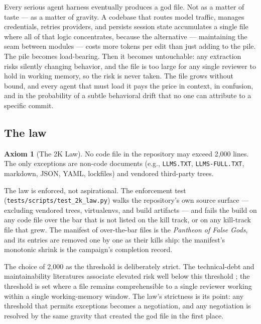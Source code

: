 \documentclass[11pt]{article}
\theoremstyle{definition}
\newtheorem{axiom}{Axiom}
\theoremstyle{plain}
\theoremstyle{remark}
\begin{document}
Every serious agent harness eventually produces a god file. Not as a matter
of taste --- as a matter of gravity. A codebase that routes model traffic,
manages credentials, retries providers, and persists session state
accumulates a single file where all of that logic concentrates, because the
alternative --- maintaining the seam between modules --- costs more tokens
per edit than just adding to the pile. The pile becomes load-bearing. Then
it becomes untouchable: any extraction risks silently changing behavior, and
the file is too large for any single reviewer to hold in working memory, so
the risk is never taken. The file grows without bound, and every agent that
must load it pays the price in context, in confusion, and in the probability
of a subtle behavioral drift that no one can attribute to a specific commit.

\subsection{The law}

\begin{axiom}[The 2K Law]
\label{ax:2k}
No code file in the repository may exceed 2{,}000 lines. The only exceptions
are non-code documents (e.g., \texttt{LLMS.TXT}, \texttt{LLMS-FULL.TXT},
markdown, JSON, YAML, lockfiles) and vendored third-party trees.
\end{axiom}

The law is enforced, not aspirational. The enforcement test
(\texttt{tests/scripts/test\_2k\_law.py}) walks the repository's own source
surface --- excluding vendored trees, virtualenvs, and build artifacts ---
and fails the build on any code file over the bar that is not listed on the
kill track, or on any kill-track file that grew. The manifest of over-the-bar
files is the \emph{Pantheon of False Gods}, and its entries are removed one
by one as their kills ship: the manifest's monotonic shrink is the campaign's
completion record.

The choice of 2{,}000 as the threshold is deliberately strict. The
technical-debt and maintainability literatures associate elevated risk well
below this threshold \citep{kruchten2012,koru2009}; the threshold is set
where a file remains comprehensible to a single reviewer working within a
single working-memory window. The law's strictness is its point: any
threshold that permits exceptions becomes a negotiation, and any negotiation
is resolved by the same gravity that created the god file in the first place.
\end{document}
